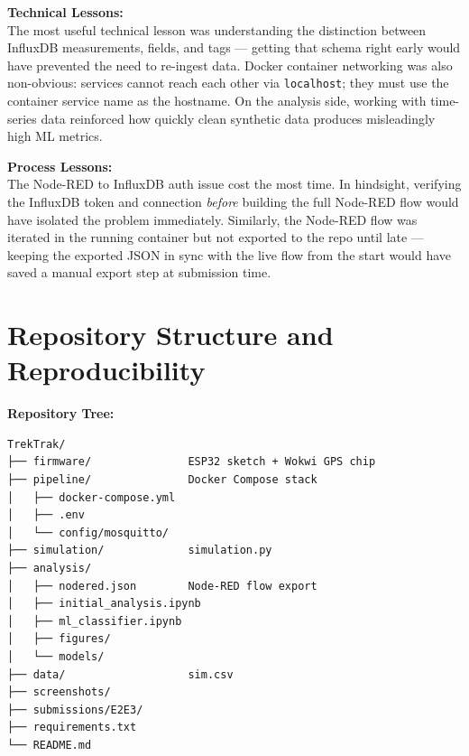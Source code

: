 \documentclass[11pt]{article}
\begin{document}
\vspace{0.5em}

\noindent\textbf{Technical Lessons:}\\{}
The most useful technical lesson was understanding the distinction between InfluxDB measurements, fields, and tags --- getting that schema right early would have prevented the need to re-ingest data. Docker container networking was also non-obvious: services cannot reach each other via \texttt{localhost}; they must use the container service name as the hostname. On the analysis side, working with time-series data reinforced how quickly clean synthetic data produces misleadingly high ML metrics.

\vspace{0.5em}

\noindent\textbf{Process Lessons:}\\{}
The Node-RED to InfluxDB auth issue cost the most time. In hindsight, verifying the InfluxDB token and connection \emph{before} building the full Node-RED flow would have isolated the problem immediately. Similarly, the Node-RED flow was iterated in the running container but not exported to the repo until late --- keeping the exported JSON in sync with the live flow from the start would have saved a manual export step at submission time.

\section{Repository Structure and Reproducibility}
\label{sec:repo}

\noindent\textbf{Repository Tree:}
\begin{verbatim}
TrekTrak/
├── firmware/               ESP32 sketch + Wokwi GPS chip
├── pipeline/               Docker Compose stack
│   ├── docker-compose.yml
│   ├── .env
│   └── config/mosquitto/
├── simulation/             simulation.py
├── analysis/
│   ├── nodered.json        Node-RED flow export
│   ├── initial_analysis.ipynb
│   ├── ml_classifier.ipynb
│   ├── figures/
│   └── models/
├── data/                   sim.csv
├── screenshots/
├── submissions/E2E3/
├── requirements.txt
└── README.md
\end{verbatim}
\end{document}

